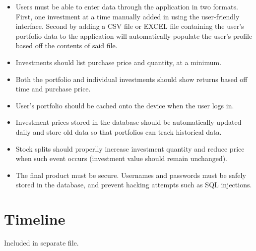 \documentclass[onecolumn, draftclsnofoot,10pt, compsoc]{IEEEtran}
\begin{document}
\begin{itemize}
	\item Users must be able to enter data through the application in two formats. First, one investment at a time manually added in using the user-friendly interface. Second by
		adding a CSV file or EXCEL file containing the user's portfolio data to the application will automatically populate the user's profile based off the contents of said file.
	\item Investments should list purchase price and quantity, at a minimum.
	\item Both the portfolio and individual investments should show returns based off time and purchase price.
	\item User's portfolio should be cached onto the device when the user logs in.
	\item Investment prices stored in the database should be automatically updated daily and store old data so that portfolios can track historical data.
	\item Stock splits should properlly increase investment quantity and reduce price when such event occurs (investment value should remain unchanged).
	\item The final product must be secure. Usernames and passwords must be safely stored in the database, and prevent hacking attempts such as SQL injections.
	
\end{itemize}
\section{Timeline}
Included in separate file.

\end{document}
